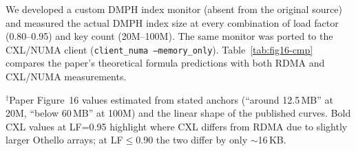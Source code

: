 \documentclass[conference]{IEEEtran}
\begin{document}
We developed a custom DMPH index monitor (absent from the original source) and measured the actual DMPH index size at every combination of load factor (0.80--0.95) and key count (20M--100M). The same monitor was ported to the CXL/NUMA client (\texttt{client\_numa --memory\_only}). Table~\ref{tab:fig16-cmp} compares the paper's theoretical formula predictions with both RDMA and CXL/NUMA measurements.

\begin{table}[H]
\centering
\caption{Paper Figure~16 vs.\ RDMA and CXL/NUMA measured DMPH index size (MB). The paper's theoretical formula is $(2.33 + 2/\epsilon) \times n$ bits; its Figure~16 text states ``around 12.5\,MB'' for 20M keys and ``below 60\,MB'' for 100M keys.}
\label{tab:fig16-cmp}
\scriptsize
{}

\vspace{2pt}
{\scriptsize $^\dagger$Paper Figure~16 values estimated from stated anchors (``around 12.5\,MB'' at 20M, ``below 60\,MB'' at 100M) and the linear shape of the published curves. Bold CXL values at LF=0.95 highlight where CXL differs from RDMA due to slightly larger Othello arrays; at LF$\leq$0.90 the two differ by only $\sim$16\,KB.}
\end{table}
\end{document}
